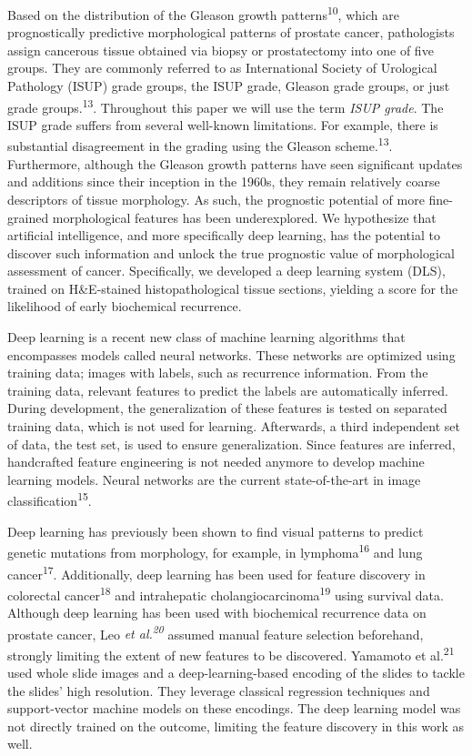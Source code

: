 \documentclass[
  12pt,
  a5,margin=2cmpaper,
]{article}
\begin{document}
Based on the distribution of the Gleason growth
patterns\textsuperscript{10}, which are prognostically predictive
morphological patterns of prostate cancer, pathologists assign cancerous
tissue obtained via biopsy or prostatectomy into one of five groups.
They are commonly referred to as International Society of Urological
Pathology (ISUP) grade groups, the ISUP grade, Gleason grade groups, or
just grade groups.\textsuperscript{13}. Throughout this paper we will
use the term \emph{ISUP grade}. The ISUP grade suffers from several
well-known limitations. For example, there is substantial disagreement
in the grading using the Gleason scheme.\textsuperscript{13}.
Furthermore, although the Gleason growth patterns have seen significant
updates and additions since their inception in the 1960s, they remain
relatively coarse descriptors of tissue morphology. As such, the
prognostic potential of more fine-grained morphological features has
been underexplored. We hypothesize that artificial intelligence, and
more specifically deep learning, has the potential to discover such
information and unlock the true prognostic value of morphological
assessment of cancer. Specifically, we developed a deep learning system
(DLS), trained on H\&E-stained histopathological tissue sections,
yielding a score for the likelihood of early biochemical recurrence.

Deep learning is a recent new class of machine learning algorithms that
encompasses models called neural networks. These networks are optimized
using training data; images with labels, such as recurrence information.
From the training data, relevant features to predict the labels are
automatically inferred. During development, the generalization of these
features is tested on separated training data, which is not used for
learning. Afterwards, a third independent set of data, the test set, is
used to ensure generalization. Since features are inferred, handcrafted
feature engineering is not needed anymore to develop machine learning
models. Neural networks are the current state-of-the-art in image
classification\textsuperscript{15}.

Deep learning has previously been shown to find visual patterns to
predict genetic mutations from morphology, for example, in
lymphoma\textsuperscript{16} and lung cancer\textsuperscript{17}.
Additionally, deep learning has been used for feature discovery in
colorectal cancer\textsuperscript{18} and intrahepatic
cholangiocarcinoma\textsuperscript{19} using survival data. Although
deep learning has been used with biochemical recurrence data on prostate
cancer, Leo \emph{et al.\textsuperscript{20}} assumed manual feature
selection beforehand, strongly limiting the extent of new features to be
discovered. Yamamoto et al.\textsuperscript{21} used whole slide images
and a deep-learning-based encoding of the slides to tackle the slides'
high resolution. They leverage classical regression techniques and
support-vector machine models on these encodings. The deep learning
model was not directly trained on the outcome, limiting the feature
discovery in this work as well.
\end{document}
